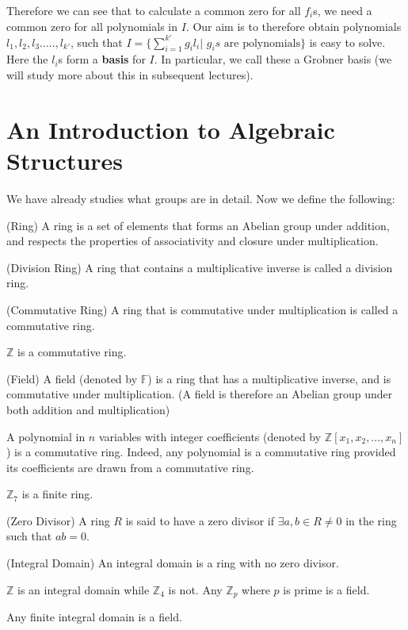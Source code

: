 Therefore we can see that to calculate a common zero for all $f_i$s, we need a common zero for all polynomials in $I$. Our aim is to therefore obtain polynomials $l_1,l_2,l_3.....,l_{k'}$, such that $I = \{\sum\limits_{i=1}^{k'} g_{i}l_{i}| \text{~}g_{i}s \text{~are polynomials}\}$ is easy to solve. Here the $l_i$s form a \textbf{basis} for $I$. In particular, we call these a Grobner basis (we will study more about this in subsequent lectures).\\

\section{An Introduction to Algebraic Structures}
We have already studies what groups are in detail. Now we define the following:
\begin{definition} (Ring)
A ring is a set of elements that forms an Abelian group under addition, and respects the properties of associativity and closure under multiplication.
\end{definition}
\begin{definition} (Division Ring)
A ring that contains a multiplicative inverse is called a division ring.
\end{definition}
\begin{definition} (Commutative Ring)
A ring that is commutative under multiplication is called a commutative ring.
\end{definition}
\begin{example}
$\mathbb{Z}$ is a commutative ring.
\end{example}
\begin{definition} (Field)
A field (denoted by $\mathbb{F}$) is a ring that has a multiplicative inverse, and is commutative under multiplication. (A field is therefore an Abelian group under both addition and multiplication)
\end{definition}

\begin{example}
A polynomial in $n$ variables with integer coefficients (denoted by $\mathbb{Z}[x_1,x_2,...,x_n]$) is a commutative ring. Indeed, any polynomial is a commutative ring provided its coefficients are drawn from a commutative ring.
\end{example}
\begin{example}
$\mathbb{Z}_7$ is a finite ring.\\
\end{example}
\begin{definition} (Zero Divisor)
A ring $R$ is said to have a zero divisor if $\exists a,b\in R \neq 0$ in the ring such that $ab = 0$.
\end{definition}
\begin{definition} (Integral Domain)
An integral domain is a ring with no zero divisor.
\end{definition}
\begin{example}
$\mathbb{Z}$ is an integral domain while $\mathbb{Z}_4$ is not. Any $\mathbb{Z}_p$ where $p$ is prime is a field.
\end{example}
\begin{theorem}
Any finite integral domain is a field.
\end{theorem}

